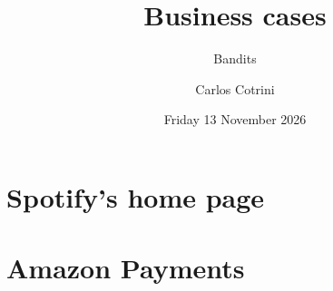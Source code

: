 \documentclass[aspectratio=169]{beamer}
\title{Business cases}
\subtitle{Bandits}
\author{Carlos Cotrini}
\institute{AI in Industry, ETH Zurich}
\date{Friday 13 November 2026}
\begin{document}
\begin{frame}
  \titlepage
\end{frame}
\section{Spotify's home page}

\section{Amazon Payments}

\end{document}
